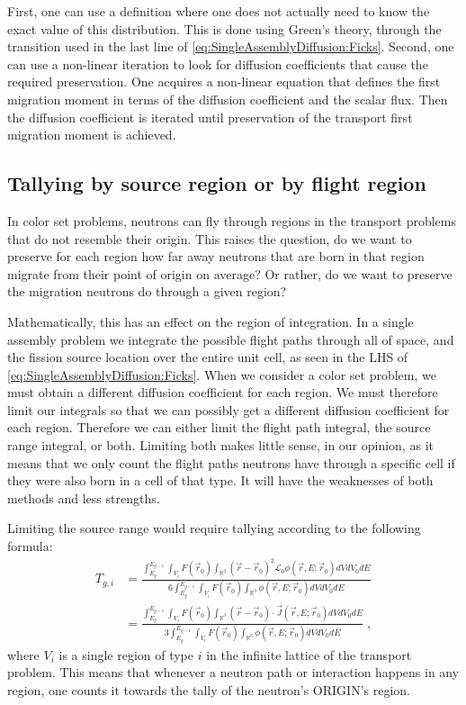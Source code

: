 \documentclass[a4paper,letterpaper,12pt,oneside,draft]{article}
\newcommand{\eec}{\;,}
\newcommand{\OpL}{\mathscr{L}}
\newcommand{\allspace}{\ensuremath{\mathbb{R}^3}}
\newcommand{\intg}[2][g]{\ensuremath{\int_{E_{#1}}^{E_{#1-1}} #2 dE}}
\newcommand{\vr}{\ensuremath{\vec{r}}}
\newcommand{\dvr}{\left(\vr-\vr_0\right)}
\begin{document}
First, one can use a definition where one does not actually need to know the exact value of this distribution.
This is done using Green's theory, through the transition used in the last line of \cref{eq:SingleAssemblyDiffusion:Ficks}.
Second, one can use a non-linear iteration to look for diffusion coefficients that cause the required preservation.
One acquires a non-linear equation that defines the first migration moment in terms of the diffusion coefficient and the scalar flux.
Then the diffusion coefficient is iterated until preservation of the transport first migration moment is achieved.

\subsection{Tallying by source region or by flight region}
In color set problems, neutrons can fly through regions in the transport problems that do not resemble their origin.
This raises the question, do we want to preserve for each region how far away neutrons that are born in that region migrate from their point of origin on average?
Or rather, do we want to preserve the migration neutrons do through a given region?

Mathematically, this has an effect on the region of integration.
In a single assembly problem we integrate the possible flight paths through all of space, and the fission source location over the entire unit cell, as seen in the LHS of \cref{eq:SingleAssemblyDiffusion:Ficks}.
When we consider a color set problem, we must obtain a different diffusion coefficient for each region. We must therefore limit our integrals so that we can possibly get a different diffusion coefficient for each region.
Therefore we can either limit the flight path integral, the source range integral, or both.
Limiting both makes little sense, in our opinion, as it means that we only count the flight paths neutrons have through a specific cell if they were also born in a cell of that type.
It will have the weaknesses of both methods and less strengths.

Limiting the source range would require tallying according to the following formula:
\begin{align}
    \nonumber
    T_{g,i} &= \frac{\intg{\int_{V_i}F(\vr_0)\int_{\allspace}\dvr^2\OpL_0\phi(\vr,E;\vr_0)dVdV_0}} {6\intg{\int_{V_i}F(\vr_0)\int_{\allspace}\phi(\vr,E;\vr_0)dVdV_0}} \\
    \label{eq:Tally:limitsource}
    &= \frac{\intg{\int_{V_i}F(\vr_0)\int_{\allspace}\dvr\cdot\vec{J}(\vr,E;\vr_0)dVdV_0}} {3\intg{\int_{V_i}F(\vr_0)\int_{\allspace}\phi(\vr,E;\vr_0)dVdV_0}}\eec
\end{align}
where $V_i$ is a single region of type $i$ in the infinite lattice of the transport problem.
This means that whenever a neutron path or interaction happens in any region, one counts it towards the tally of the neutron's ORIGIN's region.
\end{document}
